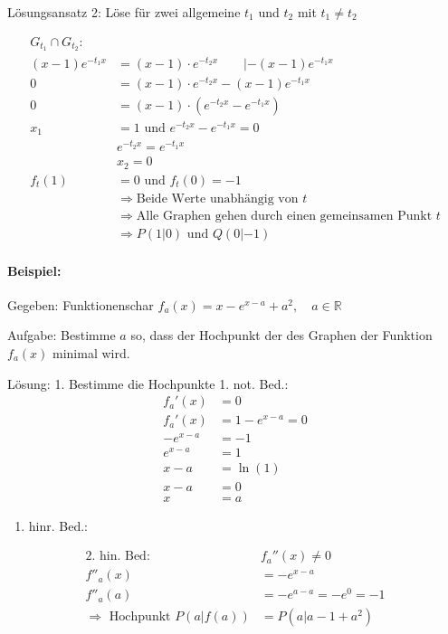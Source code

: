 \documentclass[
  letterpaper,
  DIV=11,
  numbers=noendperiod]{scrartcl}
\let\oldparagraph\paragraph
\renewcommand{\paragraph}[1]{\oldparagraph{#1}\mbox{}}
\providecommand{\tightlist}{%
  \setlength{\itemsep}{0pt}\setlength{\parskip}{0pt}}\usepackage{longtable,booktabs,array}
\begin{document}
Lösungsansatz 2: Löse für zwei allgemeine \(t_1\) und \(t_2\) mit
\(t_1 \neq t_2\)

\[
\begin{aligned}
G_{t_1} \cap G_{t_2}:&\\
(x-1 )e^{-t_1x} &= (x-1) \cdot e^{-t_2x} \qquad |-(x-1)e^{-t_1x}\\
0 &= (x-1) \cdot e^{-t_2x} - (x-1)e^{-t_1x} \\
0 &= (x-1)\cdot (e^{-t_2x}-e^{-t_1x})\\
x_1 &= 1 \text{ und } e^{-t_2x}-e^{-t_1x}=0\\
& e^{-t_2x}=e^{-t_1x}\\
& x_2=0\\
f_t(1) &= 0 \text{ und } f_t(0)=-1\\
& \Rightarrow \text{Beide Werte unabhängig von }t\\ 
& \Rightarrow \text{Alle Graphen gehen durch einen gemeinsamen Punkt }t\\
& \Rightarrow P(1|0) \text { und } Q(0|-1)  
\end{aligned}
\]

\paragraph{Beispiel:}\label{beispiel}

Gegeben: Funktionenschar
\(f_a(x)= x-e^{x-a}+a^2, \quad a\in \mathbb{R}\)

Aufgabe: Bestimme \(a\) so, dass der Hochpunkt der des Graphen der
Funktion \(f_a(x)\) minimal wird.

Lösung: 1. Bestimme die Hochpunkte 1. not. Bed.: \[
\begin{aligned}
f_a'(x) &=0\\
f_a'(x) &= 1-e^{x-a} = 0\\
-e^{x-a} &=-1\\
e^{x-a} &=1\\
x-a&=\ln{(1)}\\
x-a&=0\\
x&=a
\end{aligned}
\]

\begin{enumerate}
\def\labelenumi{\arabic{enumi}.}
\setcounter{enumi}{1}
\tightlist
\item
  hinr. Bed.:
\end{enumerate}

\[
\begin{aligned}
\text{2. hin. Bed: } &f_a''(x) \neq 0\\
f''_a(x) &= -e^{x-a}\\
f''_a(a) &= -e^{a-a} = -e^0 = -1\\
\Rightarrow  \text{ Hochpunkt } P \left(a|f(a) \right) &= P \left(a| a-1+a^2 \right) 
\end{aligned}
\]
\end{document}
